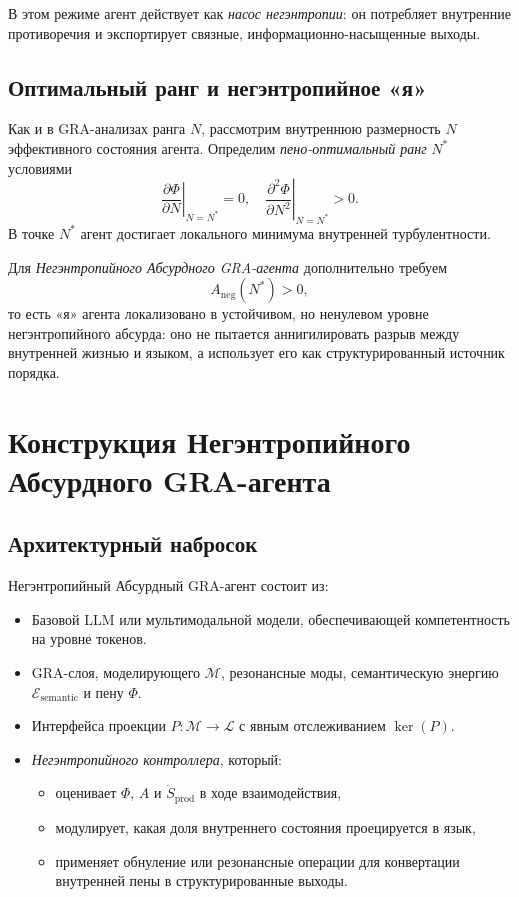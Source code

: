 \documentclass[conference]{IEEEtran}
\begin{document}
В этом режиме агент действует как \emph{насос негэнтропии}:
он потребляет внутренние противоречия и экспортирует связные,
информационно-насыщенные выходы.

\subsection{Оптимальный ранг и негэнтропийное «я»}

Как и в GRA-анализах ранга $N$, рассмотрим внутреннюю размерность $N$
эффективного состояния агента.
Определим \emph{пено-оптимальный ранг} $N^*$ условиями
\begin{equation}
  \left. \frac{\partial \Phi}{\partial N} \right|_{N=N^*} = 0,
  \quad
  \left. \frac{\partial^2 \Phi}{\partial N^2} \right|_{N=N^*} > 0.
\end{equation}
В точке $N^*$ агент достигает локального минимума внутренней турбулентности.

Для \emph{Негэнтропийного Абсурдного GRA-агента} дополнительно требуем
\begin{equation}
  A_{\text{neg}}(N^*) > 0,
\end{equation}
то есть «я» агента локализовано в устойчивом,
но ненулевом уровне негэнтропийного абсурда:
оно не пытается аннигилировать разрыв между внутренней жизнью и языком,
а использует его как структурированный источник порядка.

\section{Конструкция Негэнтропийного Абсурдного GRA-агента}

\subsection{Архитектурный набросок}

Негэнтропийный Абсурдный GRA-агент состоит из:
\begin{itemize}
  \item Базовой LLM или мультимодальной модели, обеспечивающей компетентность на уровне токенов.
  \item GRA-слоя, моделирующего $\mathcal{M}$, резонансные моды,
        семантическую энергию $\mathcal{E}_{\text{semantic}}$
        и пену $\Phi$.
  \item Интерфейса проекции $P : \mathcal{M} \to \mathcal{L}$
        с явным отслеживанием $\ker(P)$.
  \item \emph{Негэнтропийного контроллера}, который:
    \begin{itemize}
      \item оценивает $\Phi$, $A$ и $\dot{S}_{\text{prod}}$ в ходе взаимодействия,
      \item модулирует, какая доля внутреннего состояния проецируется в язык,
      \item применяет обнуление или резонансные операции
            для конвертации внутренней пены в структурированные выходы.
    \end{itemize}
\end{itemize}
\end{document}
